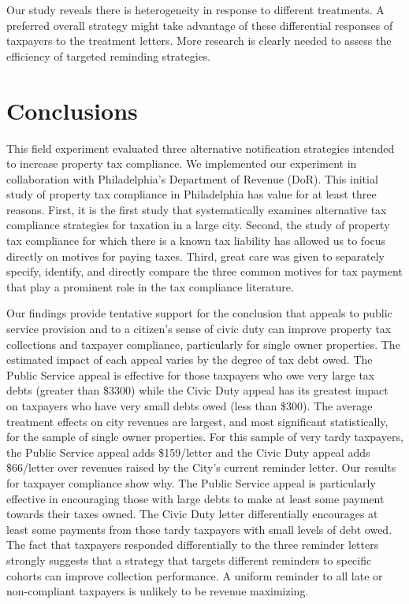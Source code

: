 \documentclass[12pt,titlepage]{article}
\begin{document}
Our study reveals there is heterogeneity in response to different
treatments.  A preferred overall strategy might take advantage of
these differential responses of taxpayers to the treatment
letters. More research is clearly needed to assess the efficiency of
targeted reminding strategies.


\section{Conclusions}

This field experiment evaluated three alternative notification
strategies intended to increase property tax compliance.  We
implemented our experiment in collaboration with Philadelphia's
Department of Revenue (DoR).  This initial study of property tax
compliance in Philadelphia has value for at least three reasons.
First, it is the first study that systematically examines alternative
tax compliance strategies for taxation in a large city.  Second, the
study of property tax compliance for which there is a known tax
liability has allowed us to focus directly on motives for paying
taxes.  Third, great care was given to separately specify, identify,
and directly compare the three common motives for tax payment that
play a prominent role in the tax compliance literature.

Our findings provide tentative support for the conclusion that appeals
to public service provision and to a citizen's sense of civic duty can
improve property tax collections and taxpayer compliance, particularly
for single owner properties.  The estimated impact of each appeal
varies by the degree of tax debt owed.  The Public Service appeal is
effective for those taxpayers who owe very large tax debts (greater
than \$3300) while the Civic Duty appeal has its greatest impact on
taxpayers who have very small debts owed (less than \$300).  The
average treatment effects on city revenues are largest, and most
significant statistically, for the sample of single owner properties.
For this sample of very tardy taxpayers, the Public Service appeal
adds \$159/letter and the Civic Duty appeal adds \$66/letter over
revenues raised by the City's current reminder letter.  Our results
for taxpayer compliance show why.  The Public Service appeal is
particularly effective in encouraging those with large debts to make
at least some payment towards their taxes owned.  The Civic Duty
letter differentially encourages at least some payments from those
tardy taxpayers with small levels of debt owed.  The fact that
taxpayers responded differentially to the three reminder letters
strongly suggests that a strategy that targets different reminders to
specific cohorts can improve collection performance.  A uniform
reminder to all late or non-compliant taxpayers is unlikely to be
revenue maximizing.
	
\end{document}
